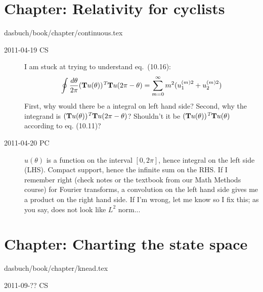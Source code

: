 \section{Chapter: Relativity for cyclists}
\label{c-continuous}
\noindent dasbuch/book/chapter/continuous.tex
\begin{description}
\item[2011-04-19 CS]
I am stuck at trying to understand eq.~(10.16):
\[
\oint\frac{d\theta}{2\pi}(\textbf{T}u(\theta))^{\emph{T}}\textbf{T}u(2\pi-\theta)
 = \sum\limits_{m=0}^{\infty}m^{2}(u_{1}^{(m)2}+u_{2}^{(m)2})
\]
First, why would there be a integral on left hand side? Second, why the
integrand is $(\textbf{T}u(\theta))^{\emph{T}}\textbf{T}u(2\pi-\theta)$?
Shouldn't it be $(\textbf{T}u(\theta))^{\emph{T}}\textbf{T}u(\theta)$
according to eq. (10.11)?

\item[2011-04-20 PC] $u(\theta)$ is a function on the interval $[0,2\pi]$,
hence integral on the left side (LHS). Compact support, hence the infinite sum
on the RHS. If I remember right (check notes or the textbook from
our Math Methods course) for Fourier transforms, a convolution on the
left hand side gives me a product on the right hand side. If I'm wrong,
let me know so I fix this; as you say, does not look like $L^2$ norm...


\end{description}


\section{Chapter: Charting the state space}
\label{c-knead}\noindent dasbuch/book/chapter/knead.tex
\begin{description}\item[2011-09-?? CS]

\end{description}


